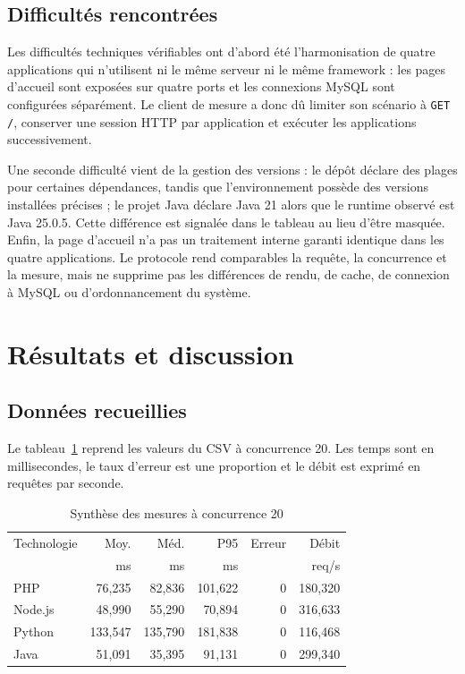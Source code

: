 \documentclass[conference,11pt]{IEEEtran}
\begin{document}
\subsection{Difficultés rencontrées}

Les difficultés techniques vérifiables ont d'abord été l'harmonisation de
quatre applications qui n'utilisent ni le même serveur ni le même framework :
les pages d'accueil sont exposées sur quatre ports et les connexions MySQL
sont configurées séparément. Le client de mesure a donc dû limiter son
scénario à \texttt{GET /}, conserver une session HTTP par application et
exécuter les applications successivement.

Une seconde difficulté vient de la gestion des versions : le dépôt déclare
des plages pour certaines dépendances, tandis que l'environnement possède des
versions installées précises ; le projet Java déclare Java 21 alors que le
runtime observé est Java 25.0.5. Cette différence est signalée dans le
tableau au lieu d'être masquée. Enfin, la page d'accueil n'a pas un traitement
interne garanti identique dans les quatre applications. Le protocole rend
comparables la requête, la concurrence et la mesure, mais ne supprime pas les
différences de rendu, de cache, de connexion à MySQL ou d'ordonnancement du
système.

\section{Résultats et discussion}

\subsection{Données recueillies}

Le tableau~\ref{tab:mesures} reprend les valeurs du CSV à concurrence 20.
Les temps sont en millisecondes, le taux d'erreur est une proportion et le
débit est exprimé en requêtes par seconde.

\begin{table}[!t]
\centering
\caption{Synthèse des mesures à concurrence 20}
\label{tab:mesures}
\scriptsize
\begin{tabular}{lrrrrr}
\toprule
Technologie & Moy. & Méd. & P95 & Erreur & Débit \\
 & ms & ms & ms & & req/s \\
\midrule
PHP & 76,235 & 82,836 & 101,622 & 0 & 180,320 \\
Node.js & 48,990 & 55,290 & 70,894 & 0 & 316,633 \\
Python & 133,547 & 135,790 & 181,838 & 0 & 116,468 \\
Java & 51,091 & 35,395 & 91,131 & 0 & 299,340 \\
\bottomrule
\end{tabular}
\end{table}
\end{document}
